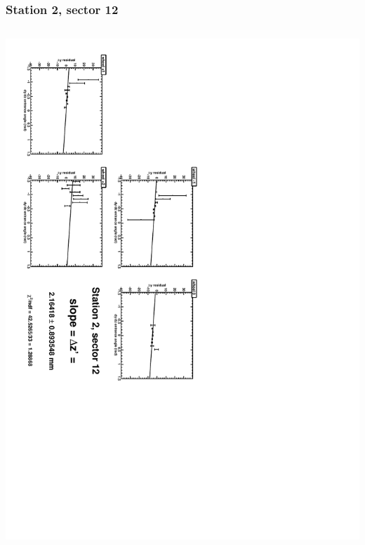 \documentclass[compress]{beamer}
\begin{document}
\begin{frame}
\frametitle{Station 2, sector 12}
\begin{columns}
\includegraphics[height=\linewidth, angle=90]{zfits/zfit_2_12.pdf}


\end{columns}
\end{frame}
\end{document}
